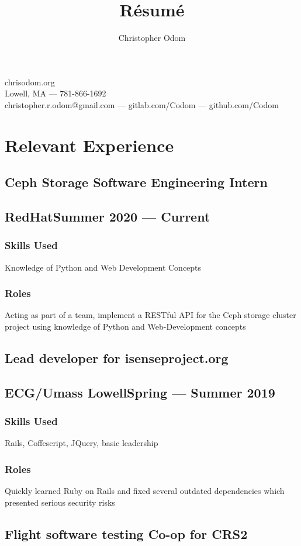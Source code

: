\documentclass[11pt]{article}
\makeatletter
\renewcommand{\maketitle}
{
\begin{center}
{\huge\bfseries \theauthor}

chrisodom.org\\
Lowell, MA ---  781-866-1692\\
christopher.r.odom@gmail.com  ---  gitlab.com/Codom --- github.com/Codom

\end{center}
}
\makeatother
\begin{document}
\title{R\'esum\'e}
\author{Christopher Odom}

\maketitle

\section{Relevant Experience}


\subsection{Ceph Storage Software Engineering Intern}
\subsection{RedHat\dotfill Summer 2020 --- Current}
\subsubsection{Skills Used} Knowledge of Python and Web Development Concepts
\subsubsection{Roles}
Acting as part of a team, implement a RESTful API for the Ceph storage
cluster project using knowledge of Python and Web-Development concepts

\subsection{Lead developer for isenseproject.org}
\subsection{ECG/Umass Lowell\dotfill Spring --- Summer 2019}
\subsubsection{Skills Used} Rails, Coffescript, JQuery, basic leadership
\subsubsection{Roles}
Quickly learned Ruby on Rails and fixed several outdated dependencies
which presented serious security risks

\subsection{Flight software testing Co-op for CRS2}
\end{document}
